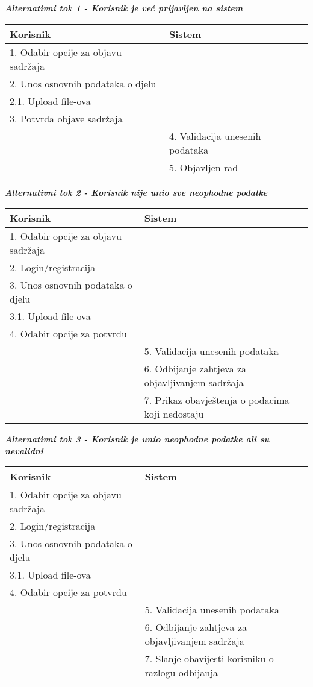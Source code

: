 \documentclass[12pt, a4paper]{report}
\begin{document}
\begin{flushleft}
\textbf{\textit{Alternativni tok 1 - Korisnik je već prijavljen na sistem}} \\
\begin{tabular}{|m{7cm}|m{7cm}|}
\hline
\textbf{Korisnik} & \textbf{Sistem} \\
\hline
1. Odabir opcije za objavu sadržaja &  \\
\hline
2. Unos osnovnih podataka o djelu &  \\
\hline
2.1. Upload file-ova &  \\
\hline
3. Potvrda objave sadržaja &  \\
\hline
 & 4. Validacija unesenih podataka \\
\hline
 & 5. Objavljen rad \\
\hline
\end{tabular} \newline \newline

{\textbf{\textit{Alternativni tok 2 - Korisnik nije unio sve neophodne podatke}}}

\begin{tabular}{|m{7cm}|m{7cm}|}
\hline
\textbf{Korisnik} & \textbf{Sistem} \\
\hline
1. Odabir opcije za objavu sadržaja &  \\
\hline
2. Login/registracija &  \\
\hline
3. Unos osnovnih podataka o djelu &  \\
\hline
3.1. Upload file-ova &  \\
\hline
4. Odabir opcije za potvrdu &  \\
\hline
 & 5. Validacija unesenih podataka \\
\hline
 & 6. Odbijanje zahtjeva za objavljivanjem sadržaja \\
\hline
 & 7. Prikaz obavještenja o podacima koji nedostaju \\
 \hline
\end{tabular} \newpage

\textbf{\textit{Alternativni tok 3 - Korisnik je unio neophodne podatke ali su nevalidni}}

\begin{tabular}{|m{7cm}|m{7cm}|}
\hline
\textbf{Korisnik} & \textbf{Sistem} \\
\hline
1. Odabir opcije za objavu sadržaja &  \\
\hline
2. Login/registracija &  \\
\hline
3. Unos osnovnih podataka o djelu &  \\
\hline
3.1. Upload file-ova &  \\
\hline
4. Odabir opcije za potvrdu &  \\
\hline
 & 5. Validacija unesenih podataka \\
\hline
 & 6. Odbijanje zahtjeva za objavljivanjem sadržaja \\
\hline
 & 7. Slanje obavijesti korisniku o razlogu odbijanja \\
 \hline
\end{tabular} \newline \newline


\end{flushleft}
\end{document}
